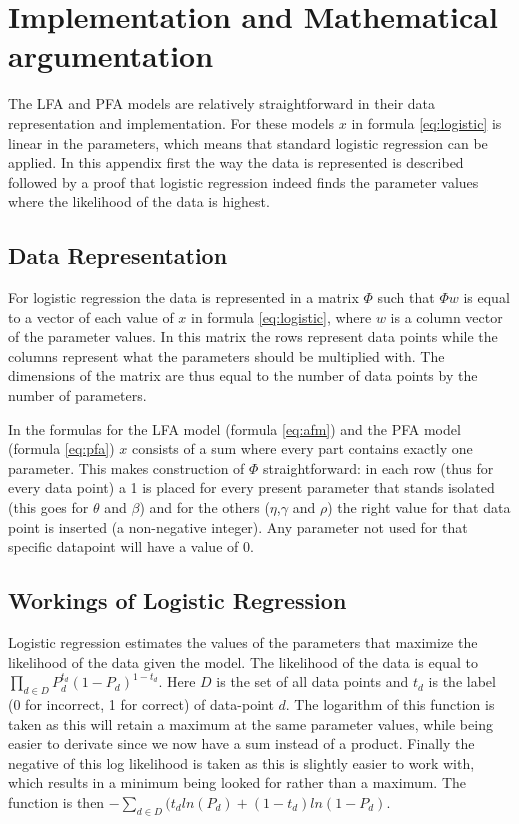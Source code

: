 \documentclass{scrartcl}
\begin{document}

\newpage
\appendix
\section{Implementation and Mathematical argumentation}
\label{app:math}
The LFA and PFA models are relatively straightforward in their data representation and implementation. For these models $x$ in formula \ref{eq:logistic} is linear in the parameters, which means that standard logistic regression can be applied. In this appendix first the way the data is represented is described followed by a proof that logistic regression indeed finds the parameter values where the likelihood of the data is highest. 
\subsection{Data Representation}
For logistic regression the data is represented in a matrix $\Phi$ such that $\Phi w$ is equal to a vector of each value of $x$ in formula \ref{eq:logistic}, where $w$ is a column vector of the parameter values. 
In this matrix the rows represent data points while the columns represent what the parameters should be multiplied with. The dimensions of the matrix are thus equal to the number of data points by the number of parameters.

In the formulas for the LFA model (formula \ref{eq:afm}) and the PFA model (formula \ref{eq:pfa}) $x$ consists of a sum where every part contains exactly one parameter. This makes construction of $\Phi$ straightforward: in each row (thus for every data point) a 1 is placed for every present parameter that stands isolated (this goes for $\theta$ and $\beta$) and for the others ($\eta$,$\gamma$ and $\rho$) the right value for that data point is inserted (a non-negative integer). Any parameter not used for that specific datapoint will have a value of 0.

\subsection{Workings of Logistic Regression}
Logistic regression estimates the values of the parameters that maximize the likelihood of the data given the model. The likelihood of the data is equal to $\prod_{d \in D} P_{d}^{t_d}  (1- P_{d})^{1-t_d} $. Here $D$ is the set of all data points and $t_{d}$ is the label (0 for incorrect, 1 for correct) of data-point $d$. The logarithm of this function is taken as this will retain a maximum at the same parameter values, while being easier to derivate since we now have a sum instead of a product. Finally the negative of this log likelihood is taken as this is slightly easier to work with, which results in a minimum being looked for rather than a maximum. The function is then $-\sum_{d \in D}(t_{d} ln(P_{d})+(1-t_{d}) ln(1-P_{d})$.
\end{document}
